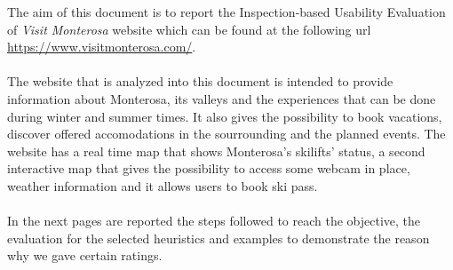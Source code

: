 The aim of this document is to report the Inspection-based Usability Evaluation of \emph{Visit Monterosa} website which can be found at the following url \url{https://www.visitmonterosa.com/}. \\ \\
The website that is analyzed into this document is intended to provide information about Monterosa, its valleys and the experiences that can be done during winter and summer times. It also gives the possibility to book vacations, discover offered accomodations in the sourrounding and the planned events. The website has a real time map that shows Monterosa's skilifts' status, a second interactive map that gives the possibility to access some webcam in place, weather information and it allows users to book ski pass.\\ \\
In the next pages are reported the steps followed to reach the objective, the evaluation for the selected heuristics and examples to demonstrate the reason why we gave certain ratings.
